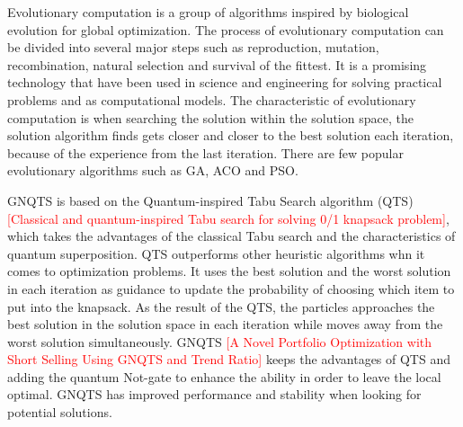 \documentclass[../main.tex]{subfiles}
\begin{document}
Evolutionary computation is a group of algorithms inspired by biological evolution for global optimization. The process of evolutionary computation can be divided into several major steps such as reproduction, mutation, recombination, natural selection and survival of the fittest. It is a promising technology that have been used in science and engineering for solving practical problems and as computational models. The characteristic of evolutionary computation is when searching the solution within the solution space, the solution algorithm finds gets closer and closer to the best solution each iteration, because of the experience from the last iteration. There are few popular evolutionary algorithms such as GA, ACO and PSO.
\bigbreak

GNQTS is based on the Quantum-inspired Tabu Search algorithm (QTS) \textcolor{red}{[Classical and quantum-inspired Tabu search for solving 0/1 knapsack problem]}, which takes the advantages of the classical Tabu search and the characteristics of quantum superposition. QTS outperforms other heuristic algorithms whn it comes to optimization problems. It uses the best solution and the worst solution in each iteration as guidance to update the probability of choosing which item to put into the knapsack. As the result of the QTS, the particles approaches the best solution in the solution space in each iteration while moves away from the worst solution simultaneously. GNQTS \textcolor{red}{[A Novel Portfolio Optimization with Short Selling Using GNQTS and Trend Ratio]} keeps the advantages of QTS and adding the quantum Not-gate to enhance the ability in order to leave the local optimal. GNQTS has improved performance and stability when looking for potential solutions.
\end{document}
